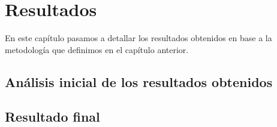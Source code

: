 \chapter{Resultados}

En este capítulo pasamos a detallar los resultados obtenidos en base a la metodología que definimos en el capítulo anterior.

\section{Análisis inicial de los resultados obtenidos}


\section{Resultado final}



